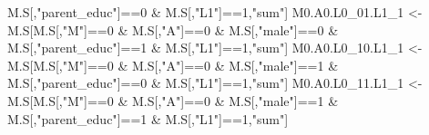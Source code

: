 \documentclass[
]{book}
\newenvironment{Shaded}{\begin{snugshade}}{\end{snugshade}}
\newcommand{\DecValTok}[1]{\textcolor[rgb]{0.00,0.00,0.81}{#1}}
\newcommand{\NormalTok}[1]{#1}
\newcommand{\OtherTok}[1]{\textcolor[rgb]{0.56,0.35,0.01}{#1}}
\newcommand{\SpecialCharTok}[1]{\textcolor[rgb]{0.00,0.00,0.00}{#1}}
\newcommand{\StringTok}[1]{\textcolor[rgb]{0.31,0.60,0.02}{#1}}
\begin{document}
\begin{Shaded}
\begin{Highlighting}[]
\NormalTok{                            M.S[,}\StringTok{"parent\_educ"}\NormalTok{]}\SpecialCharTok{==}\DecValTok{0} \SpecialCharTok{\&}\NormalTok{ M.S[,}\StringTok{"L1"}\NormalTok{]}\SpecialCharTok{==}\DecValTok{1}\NormalTok{,}\StringTok{"sum"}\NormalTok{]}
\NormalTok{  M0.A0.L0\_01.L1\_1 }\OtherTok{\textless{}{-}}\NormalTok{ M.S[M.S[,}\StringTok{"M"}\NormalTok{]}\SpecialCharTok{==}\DecValTok{0} \SpecialCharTok{\&}\NormalTok{ M.S[,}\StringTok{"A"}\NormalTok{]}\SpecialCharTok{==}\DecValTok{0} \SpecialCharTok{\&}\NormalTok{ M.S[,}\StringTok{"male"}\NormalTok{]}\SpecialCharTok{==}\DecValTok{0} \SpecialCharTok{\&} 
\NormalTok{                            M.S[,}\StringTok{"parent\_educ"}\NormalTok{]}\SpecialCharTok{==}\DecValTok{1} \SpecialCharTok{\&}\NormalTok{ M.S[,}\StringTok{"L1"}\NormalTok{]}\SpecialCharTok{==}\DecValTok{1}\NormalTok{,}\StringTok{"sum"}\NormalTok{]}
\NormalTok{  M0.A0.L0\_10.L1\_1 }\OtherTok{\textless{}{-}}\NormalTok{ M.S[M.S[,}\StringTok{"M"}\NormalTok{]}\SpecialCharTok{==}\DecValTok{0} \SpecialCharTok{\&}\NormalTok{ M.S[,}\StringTok{"A"}\NormalTok{]}\SpecialCharTok{==}\DecValTok{0} \SpecialCharTok{\&}\NormalTok{ M.S[,}\StringTok{"male"}\NormalTok{]}\SpecialCharTok{==}\DecValTok{1} \SpecialCharTok{\&} 
\NormalTok{                            M.S[,}\StringTok{"parent\_educ"}\NormalTok{]}\SpecialCharTok{==}\DecValTok{0} \SpecialCharTok{\&}\NormalTok{ M.S[,}\StringTok{"L1"}\NormalTok{]}\SpecialCharTok{==}\DecValTok{1}\NormalTok{,}\StringTok{"sum"}\NormalTok{]}
\NormalTok{  M0.A0.L0\_11.L1\_1 }\OtherTok{\textless{}{-}}\NormalTok{ M.S[M.S[,}\StringTok{"M"}\NormalTok{]}\SpecialCharTok{==}\DecValTok{0} \SpecialCharTok{\&}\NormalTok{ M.S[,}\StringTok{"A"}\NormalTok{]}\SpecialCharTok{==}\DecValTok{0} \SpecialCharTok{\&}\NormalTok{ M.S[,}\StringTok{"male"}\NormalTok{]}\SpecialCharTok{==}\DecValTok{1} \SpecialCharTok{\&} 
\NormalTok{                            M.S[,}\StringTok{"parent\_educ"}\NormalTok{]}\SpecialCharTok{==}\DecValTok{1} \SpecialCharTok{\&}\NormalTok{ M.S[,}\StringTok{"L1"}\NormalTok{]}\SpecialCharTok{==}\DecValTok{1}\NormalTok{,}\StringTok{"sum"}\NormalTok{]}
  

\end{Highlighting}
\end{Shaded}
\end{document}
